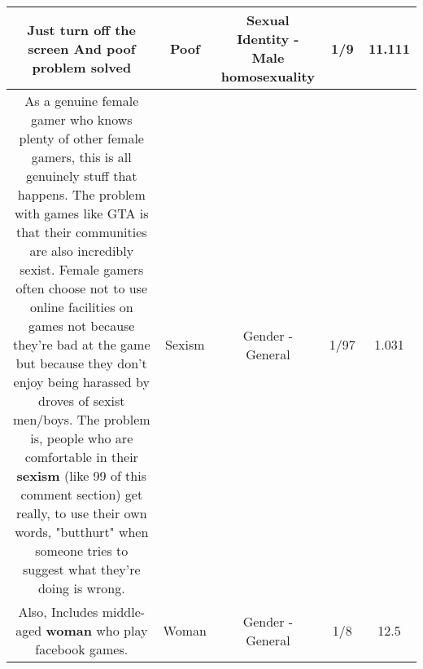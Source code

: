 \documentclass[11pt]{article}
\newlength\mylength
\begin{document}
\begin{center}
\begin{longtable}{|C{.65\mylength}|C{.30\mylength}|C{.12\mylength}|C{.12\mylength}|C{.12\mylength}|}
  \small Just turn off the screen And \textbf{poof} problem solved\normalsize   & Poof & Sexual Identity - Male homosexuality & 1/9 & 11.111 \\  \hline
  \small As a genuine female gamer who knows plenty of other female gamers, this is all genuinely stuff that happens. The problem with games like GTA is that their communities are also incredibly sexist. Female gamers often choose not to use online facilities on games not because they're bad at the game but because they don't enjoy being harassed by droves of sexist men/boys. The problem is, people who are comfortable in their \textbf{sexism} (like 99 of this comment section) get really, to use their own words, "butthurt" when someone tries to suggest what they're doing is wrong.\normalsize   & Sexism & Gender - General & 1/97 & 1.031 \\  \hline
  \small Also, Includes middle-aged \textbf{woman} who play facebook games.\normalsize   & Woman & Gender - General & 1/8 & 12.5 \\  \hline

\end{longtable}
\end{center}
\end{document}
